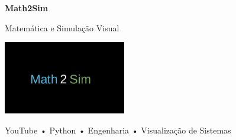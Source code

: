 \begin{frame}{}
\centering
\Huge \textbf{Math2Sim}

\vspace{0.3cm}
\Large Matemática e Simulação Visual

\vspace{1cm}
\includegraphics[width=0.4\textwidth]{Figures/math2sim.jpg}

\vspace{1cm}
\small
YouTube • Python • Engenharia • Visualização de Sistemas
\end{frame}

